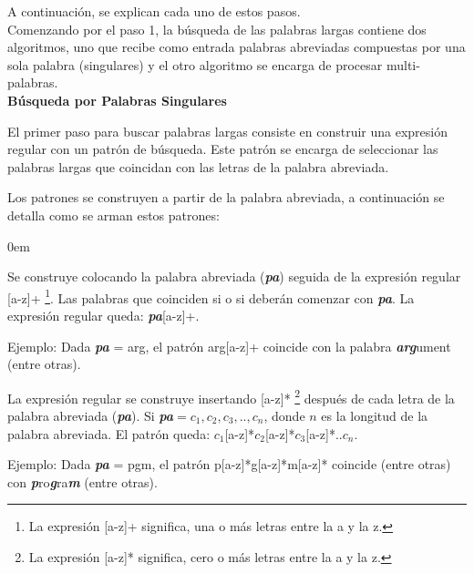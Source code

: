 A continuación, se explican cada uno de estos pasos.\\

Comenzando por el paso 1, la búsqueda de las palabras largas contiene dos algoritmos, uno que recibe como entrada palabras abreviadas compuestas por una sola palabra (singulares) y el otro algoritmo se encarga de procesar multi-palabras.\\

\noindent \textbf{Búsqueda por Palabras Singulares\\}

El primer paso para buscar palabras largas consiste en construir una expresión regular con un patrón de búsqueda.  Este patrón se encarga de seleccionar las palabras largas que coincidan con las letras de la palabra abreviada.

Los patrones se construyen a partir de la palabra abreviada, a continuación se detalla como se arman estos patrones: 

\begin{description}
\itemsep0em%
\item[Patrón prefijo:] Se construye colocando la palabra abreviada (\textit{\textbf{pa}}) seguida de la expresión regular [a-z]+ \footnote[1]{La expresión [a-z]+ significa, una o más letras entre la a y la z.}. Las palabras que coinciden si o si deberán comenzar con \textit{\textbf{pa}}. La expresión regular queda: \textit{\textbf{pa}}[a-z]+.

Ejemplo: Dada \textit{\textbf{pa}} = \textsf{arg}, el patrón \textsf{arg}[a-z]+ coincide con la palabra \textit{\textbf{arg}}ument (entre otras).

\item[Patrón compuesto por letras:]  La expresión regular se construye insertando [a-z]* \footnote[1]{La expresión [a-z]* significa, cero o más letras entre la a y la z.} después de cada letra de la palabra abreviada (\textit{\textbf{pa}}). Si \textit{\textbf{pa}}$=c_{1},c_{2},c_{3},..,c_{n}$, donde $n$ es la longitud de la palabra abreviada. El patrón queda: $c_{1}$[a-z]*$c_{2}$[a-z]*$c_{3}$[a-z]*..$c_{n}$.

Ejemplo: Dada \textit{\textbf{pa}} = \textsf{pgm}, el patrón \textsf{p}[a-z]*\textsf{g}[a-z]*\textsf{m}[a-z]* coincide (entre otras) con  \textit{\textbf{p}}ro\textit{\textbf{g}}ra\textit{\textbf{m}} (entre otras).
\end{description}



